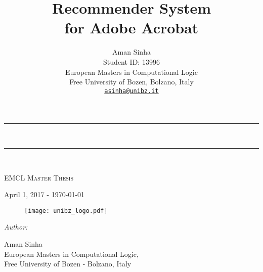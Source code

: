 {\pagestyle{empty}
\newcommand{\printtitle}{%
{\Huge\bf Extending Coloured Petri Nets with Relational Databases\\[0.8cm]}}    %

\author{
		Aman Sinha \\
        Student ID: 13996 \\ 
		European Masters in Computational Logic \\
        Free University of Bozen, Bolzano, Italy \\
        \href{mailto:asinha@unibz.it}{{\tt asinha@unibz.it}}}
        
\begin{titlepage}
	\begin{center}

	\hrule
	\textsc{}
	\\[0.4cm]
	
	\title{{ \Huge \bfseries Recommender System \\for Adobe Acrobat\\[0.4cm]}}
	
	\hrule
	\textsc{}
	\\[1.4cm]
	
	\vspace{3mm}
	
	\textsc{\Huge EMCL Master Thesis}\\[0.5cm]
	
	\begin{center}
	\large{April 1, 2017 - \today}
	\end{center}
	\begin{figure}[!htbp]
		\centering
   		\texttt{[image: unibz\_logo.pdf]}
   		\label{fig:unibz_logo}
	\end{figure}
	\vspace{20mm}
	
	\begin{flushleft} \large
	\emph{\large{Author:}}
	\vspace{2mm}
	
    \normalsize{Aman Sinha}\\
	\vspace{3mm}
	\small{European Masters in Computational Logic,\\
	Free University of Bozen - Bolzano, Italy}
	\vspace{10mm}
	

\end{flushleft}
\end{center}
\end{titlepage}}
